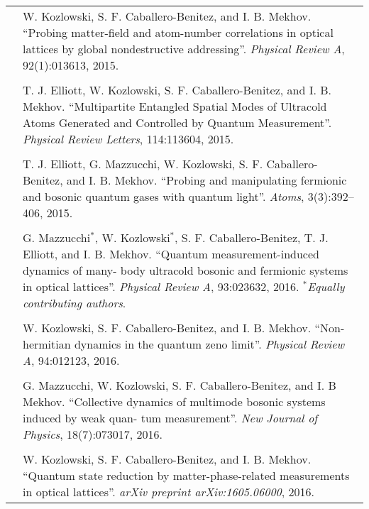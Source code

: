 \begin{table}[hbtp!]
  \centering
  \begin{tabular}{r p{13cm}}
    \toprule
    \cite{kozlowski2015} & W. Kozlowski, S. F. Caballero-Benitez, and
    I. B. Mekhov.  ``Probing matter-field and atom-number correlations
    in optical lattices by global nondestructive addressing''.
    \emph{Physical Review A}, 92(1):013613, 2015. \\ \\

    \cite{elliott2015} & T. J. Elliott, W. Kozlowski,
    S. F. Caballero-Benitez, and I. B. Mekhov. ``Multipartite
    Entangled Spatial Modes of Ultracold Atoms Generated and
    Controlled by Quantum Measurement''. \emph{Physical Review
      Letters}, 114:113604, 2015. \\ \\

    \cite{atoms2015} & T. J. Elliott, G. Mazzucchi, W. Kozlowski,
    S. F. Caballero- Benitez, and I. B. Mekhov. ``Probing and
    manipulating fermionic and bosonic quantum gases with quantum
    light''. \emph{Atoms}, 3(3):392–406, 2015. \\ \\

    \cite{mazzucchi2016} & G. Mazzucchi$^*$, W. Kozlowski$^*$,
    S. F. Caballero-Benitez, T. J.  Elliott, and
    I. B. Mekhov. ``Quantum measurement-induced dynamics of many- body
    ultracold bosonic and fermionic systems in optical
    lattices''. \emph{Physical Review A}, 93:023632,
    2016. $^*$\emph{Equally contributing authors}. \\ \\

    \cite{kozlowski2016zeno} & W. Kozlowski, S. F. Caballero-Benitez,
    and I. B. Mekhov. ``Non- hermitian dynamics in the quantum zeno
    limit''. \emph{Physical Review A}, 94:012123, 2016. \\ \\ 

    \cite{mazzucchi2016njp} & G. Mazzucchi, W. Kozlowski,
    S. F. Caballero-Benitez, and I. B Mekhov. ``Collective dynamics of
    multimode bosonic systems induced by weak quan- tum
    measurement''. \emph{New Journal of Physics}, 18(7):073017, 2016. \\ \\

    \cite{kozlowski2016phase} & W. Kozlowski, S. F. Caballero-Benitez,
    and I. B. Mekhov. ``Quantum state reduction by
    matter-phase-related measurements in optical
    lattices''. \emph{arXiv preprint arXiv:1605.06000}, 2016. \\

    \bottomrule
  \end{tabular}
\end{table}
